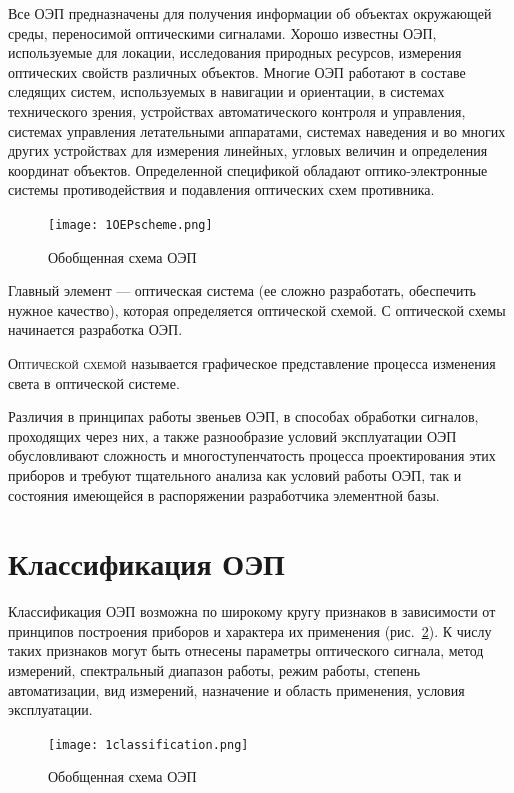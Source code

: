 \documentclass{tufte-book}
\begin{document}
Все ОЭП предназначены для получения информации об объектах окружающей среды, переносимой оптическими сигналами. Хорошо известны ОЭП, используемые для локации, исследования природных ресурсов, измерения оптических свойств различных объектов. Многие ОЭП работают в составе следящих систем, используемых в навигации и ориентации, в системах технического зрения, устройствах автоматического контроля и управления, системах управления летательными аппаратами, системах наведения и во многих других устройствах для измерения линейных, угловых величин и определения координат объектов. Определенной спецификой обладают оптико-электронные системы противодействия и подавления оптических схем противника.

\begin{figure}[h]
	\texttt{[image: 1OEPscheme.png]}%
	\caption{Обобщенная схема ОЭП}%
	\label{pic:1OEPscheme}%
\end{figure}

Главный элемент --- оптическая система (ее сложно разработать, обеспечить нужное качество), которая определяется оптической схемой. С оптической схемы начинается разработка ОЭП.

\textsc{Оптической схемой} называется графическое представление процесса изменения света в оптической системе.

Различия в принципах работы звеньев ОЭП, в способах обработки сигналов, проходящих через них, а также разнообразие условий эксплуатации ОЭП обусловливают сложность и многоступенчатость процесса проектирования этих приборов и требуют тщательного анализа как условий работы ОЭП, так и состояния имеющейся в распоряжении разработчика элементной базы.

\section{Классификация ОЭП}

Классификация ОЭП возможна по широкому кругу признаков в зависимости от принципов построения приборов и характера их применения (рис.~\ref{pic:1Classification}). К числу таких признаков могут быть отнесены параметры оптического сигнала, метод измерений, спектральный диапазон работы, режим работы, степень автоматизации, вид измерений, назначение и область применения, условия эксплуатации.

\begin{figure}[h]
	\texttt{[image: 1classification.png]}
	\caption{Обобщенная схема ОЭП}%
	\label{pic:1Classification}%
\end{figure}
\end{document}
